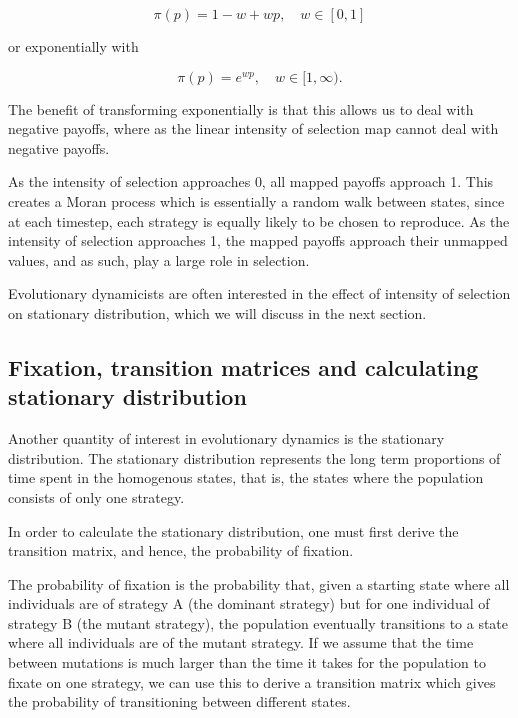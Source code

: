 \begin{equation*}
    \pi(p) = 1 - w + wp, \quad w \in [0,1]
\end{equation*}

or exponentially with

\begin{equation*}
    \pi(p) = e^{wp}, \quad w \in [1, \infty).
\end{equation*}

The benefit of transforming exponentially is that this allows us to deal with negative payoffs, where as the linear intensity of selection map cannot deal with negative payoffs.

As the intensity of selection approaches 0, all mapped payoffs approach 1.
This creates a Moran process which is essentially a random walk between states, since at each timestep, each strategy is equally likely to be chosen to reproduce.
As the intensity of selection approaches 1, the mapped payoffs approach their unmapped values, and as such, play a large role in selection.

Evolutionary dynamicists are often interested in the effect of intensity of selection on stationary distribution, which we will discuss in the next section.

\subsection{Fixation, transition matrices and calculating stationary distribution}

Another quantity of interest in evolutionary dynamics is the stationary distribution.
The stationary distribution represents the long term proportions of time spent in the homogenous states, that is, the states where the population consists of only one strategy.

In order to calculate the stationary distribution, one must first derive the transition matrix, and hence, the probability of fixation.

The probability of fixation is the probability that, given a starting state where all individuals are of strategy A (the dominant strategy) but for one individual of strategy B (the mutant strategy), the population eventually transitions to a state where all individuals are of the mutant strategy.
If we assume that the time between mutations is much larger than the time it takes for the population to fixate on one strategy, we can use this to derive a transition matrix which gives the probability of transitioning between different states.

